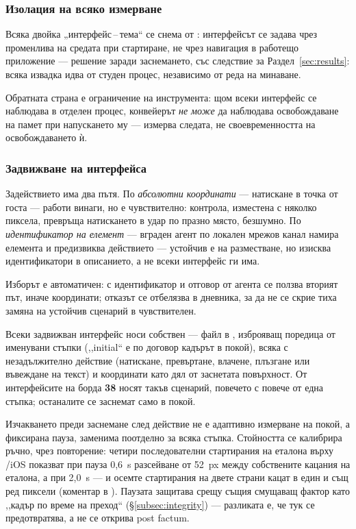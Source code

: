 \subsubsection{Изолация на всяко измерване}

Всяка двойка „интерфейс\,--\,тема“ се снема от : интерфейсът
се задава чрез променлива на средата при стартиране, не чрез навигация в работещо
приложение --- решение заради заснемането, със следствие за Раздел~\ref{sec:results}:
всяка извадка идва от студен процес, независимо от реда на минаване.

Обратната страна е ограничение на инструмента: щом всеки интерфейс се наблюдава в
отделен процес, конвейерът \emph{не може} да наблюдава освобождаване на памет при
напускането му --- измерва следата, не своевременността на освобождаването ѝ.

\subsubsection{Задвижване на интерфейса}

Задействието има два пътя. По \emph{абсолютни координати} --- натискане в точка от
госта --- работи винаги, но е чувствително: контрола, изместена с няколко пиксела,
превръща натискането в удар по празно място, безшумно. По \emph{идентификатор на
елемент} --- вграден агент по локален мрежов канал намира елемента и предизвиква
действието --- устойчив е на разместване, но изисква идентификатори в описанието, а не
всеки интерфейс ги има.

Изборът е автоматичен: с идентификатор и отговор от агента се ползва вторият път,
иначе координати; отказът се отбелязва в дневника, за да не се скрие тиха замяна на
устойчив сценарий в чувствителен.

Всеки задвижван интерфейс носи собствен  --- файл в
, изброяващ поредица от именувани стъпки (,,initial“ е
по договор кадърът в покой), всяка с незадължително действие (натискане, превъртане,
влачене, плъзгане или въвеждане на текст) и координати като дял от заснетата
повърхност. От интерфейсите на борда \textbf{38} носят такъв сценарий, повечето с
повече от една стъпка; останалите се заснемат само в покой.

Изчакването преди заснемане след действие не е адаптивно измерване на покой, а
фиксирана пауза, заменима поотделно за всяка стъпка. Стойността се калибрира ръчно,
чрез повторение: четири последователни стартирания на еталона върху /iOS
показват при пауза 0,6~s разсейване от 52~px между собствените кацания на еталона, а
при 2,0~s --- и осемте стартирания на двете страни кацат в един и същ ред пиксели
(коментар в ). Паузата защитава срещу същия смущаващ
фактор като ,,кадър по време на преход“ (§\ref{subsec:integrity}) --- разликата е, че
тук се предотвратява, а не се открива post factum.

